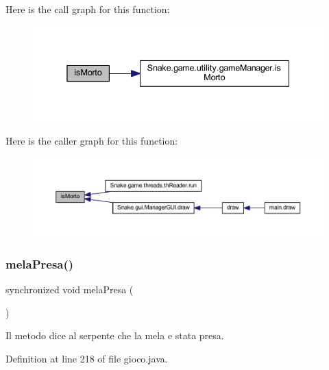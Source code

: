 Here is the call graph for this function\+:
\nopagebreak
\begin{figure}[H]
\begin{center}
\leavevmode
\includegraphics[width=338pt]{class_snake_1_1game_1_1gioco_a4bfdf00a78db51587515ac33ff8b6640_cgraph}
\end{center}
\end{figure}
Here is the caller graph for this function\+:
\nopagebreak
\begin{figure}[H]
\begin{center}
\leavevmode
\includegraphics[width=350pt]{class_snake_1_1game_1_1gioco_a4bfdf00a78db51587515ac33ff8b6640_icgraph}
\end{center}
\end{figure}
\mbox{\label{class_snake_1_1game_1_1gioco_ab565cb1ea4ead20f825d28b7e78ec5c8}} 
\subsubsection{\texorpdfstring{mela\+Presa()}{melaPresa()}}
{\footnotesize\ttfamily synchronized void mela\+Presa (\begin{DoxyParamCaption}{ }\end{DoxyParamCaption})}



Il metodo dice al serpente che la mela e\textquotesingle{} stata presa. 



Definition at line 218 of file gioco.\+java.

